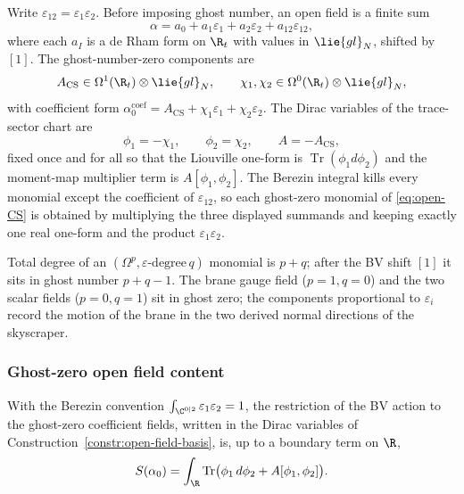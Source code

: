 \documentclass[11pt]{memoir}
\begin{document}
\begin{constr}\label{constr:open-field-basis}
  Write \(\varepsilon_{12}=\varepsilon_1\varepsilon_2\). Before
  imposing ghost number, an open field is a finite sum
  \[
    \alpha=a_0+a_1\varepsilon_1+a_2\varepsilon_2+a_{12}\varepsilon_{12},
  \]
  where each \(a_I\) is a de Rham form on \(\R_t\) with values in
  \(\lie{gl}_N\), shifted by \([1]\). The ghost-number-zero
  components are
  \[
    A_{\mathrm{CS}}\in\Omega^1(\R_t)\otimes\lie{gl}_N,\qquad
    \chi_1,\chi_2\in\Omega^0(\R_t)\otimes\lie{gl}_N,
  \]
  with coefficient form
  \(\alpha_0^{\mathrm{coef}}
    =A_{\mathrm{CS}}+\chi_1\varepsilon_1+\chi_2\varepsilon_2\). The
  Dirac variables of the trace-sector chart are
  \[
    \phi_1=-\chi_1,\qquad \phi_2=\chi_2,\qquad A=-A_{\mathrm{CS}},
  \]
  fixed once and for all so that the Liouville one-form is
  \(\operatorname{Tr}(\phi_1d\phi_2)\) and the moment-map multiplier
  term is \(A[\phi_1,\phi_2]\). The Berezin integral kills every
  monomial except the coefficient of \(\varepsilon_{12}\), so each
  ghost-zero monomial of \eqref{eq:open-CS} is obtained by multiplying
  the three displayed summands and keeping exactly one real one-form
  and the product \(\varepsilon_1\varepsilon_2\).
\end{constr}

\begin{rmk}
  Total degree of an \((\Omega^p,\varepsilon\text{-degree}\,q)\)
  monomial is \(p+q\); after the BV shift \([1]\) it sits in ghost
  number \(p+q-1\). The brane gauge field
  (\(p=1,q=0\)) and the two scalar fields (\(p=0,q=1\)) sit in ghost
  zero; the components proportional to \(\varepsilon_i\) record the
  motion of the brane in the two derived normal directions of the
  skyscraper.
\end{rmk}

\subsubsection{Ghost-zero open field content}\label{sssec:ghost-zero-open}

\begin{lem}\label{lem:open-action-reduction}
  With the Berezin convention
  $\int_{\C^{0|2}}\varepsilon_1\varepsilon_2=1$, the restriction of the
  BV action to the ghost-zero coefficient fields, written in the
  Dirac variables of Construction~\ref{constr:open-field-basis}, is, up
  to a boundary term on $\R$,
  $$S(\alpha_0)=\int_\R\mathrm{Tr}\bigl(\phi_1\,d\phi_2
    +A[\phi_1,\phi_2]\bigr).$$
\end{lem}
\end{document}

